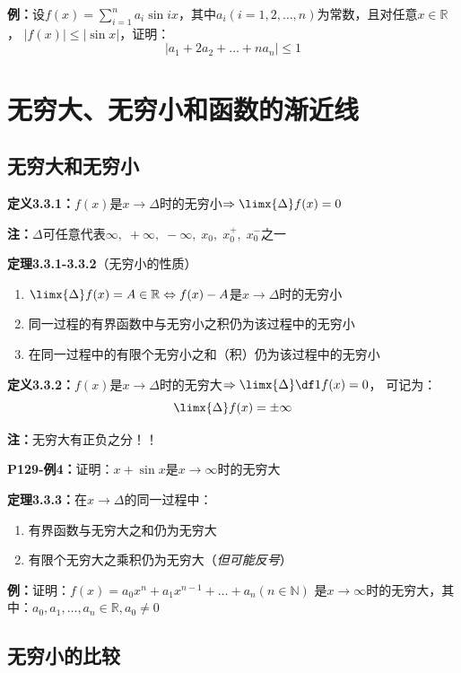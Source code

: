 {\bf 例：}设$f(x)=\sum\limits_{i=1}^na_i\sin
ix$，其中$a_i(i=1,2,\ldots,n)$为常数，且对任意$x\in\mathbb{R}$， $|f(x)|\leq |\sin x|$，证明：
$$\left|a_1+2a_2+\ldots+na_n\right|\leq 1$$

\section{无穷大、无穷小和函数的渐近线}

\subsection{无穷大和无穷小}

{\bf 定义3.3.1：}$f(x)$是$x\to\Delta$时的无穷小$\Rightarrow\limx{\Delta}f(x)=0$

{\bf 注：}$\Delta$可任意代表$\infty,\;+\infty,\;-\infty,\;x_0,\;x_0^+,\;x_0^-$之一

{\bf 定理3.3.1-3.3.2}（无穷小的性质）
\begin{enumerate}[(1)]
  \setlength{\itemindent}{1cm}
  \item $\limx{\Delta}f(x)=A\in\mathbb{R}\Leftrightarrow
  f(x)-A$是$x\to\Delta$时的无穷小
  \item 同一过程的有界函数中与无穷小之积仍为该过程中的无穷小
  \item 在同一过程中的有限个无穷小之和（积）仍为该过程中的无穷小
\end{enumerate}

{\bf 定义3.3.2：}$f(x)$是$x\to\Delta$时的无穷大$\Rightarrow\limx{\Delta}\df 1{f(x)}=0$，
可记为：
$$\limx{\Delta}f(x)=\pm\infty$$

{\bf 注：}无穷大有正负之分！！

{\bf P129-例4：}证明：$x+\sin x$是$x\to\infty$时的无穷大

{\bf 定理3.3.3：}在$x\to\Delta$的同一过程中：
\begin{enumerate}[(1)]
  \setlength{\itemindent}{1cm}
  \item 有界函数与无穷大之和仍为无穷大
  \item 有限个无穷大之乘积仍为无穷大（{\it 但可能反号}）
\end{enumerate}

{\bf 例：}证明：$f(x)=a_0x^n+a_1x^{n-1}+\ldots+a_n(n\in\mathbb{N})$
是$x\to\infty$时的无穷大，其中：$a_0,a_1,\ldots,a_n\in\mathbb{R},a_0\ne 0$

\subsection{无穷小的比较}

